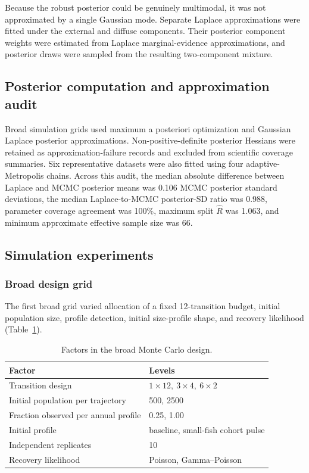 \documentclass[11pt]{article}
\begin{document}
Because the robust posterior could be genuinely multimodal, it was not
approximated by a single Gaussian mode. Separate Laplace approximations were
fitted under the external and diffuse components. Their posterior component
weights were estimated from Laplace marginal-evidence approximations, and
posterior draws were sampled from the resulting two-component mixture.

\subsection{Posterior computation and approximation audit}

Broad simulation grids used maximum a posteriori optimization and Gaussian
Laplace posterior approximations. Non-positive-definite posterior Hessians
were retained as approximation-failure records and excluded from scientific
coverage summaries. Six representative datasets were also fitted using four
adaptive-Metropolis chains. Across this audit, the median absolute difference
between Laplace and MCMC posterior means was 0.106 MCMC posterior standard
deviations, the median Laplace-to-MCMC posterior-SD ratio was 0.988, parameter
coverage agreement was 100\%, maximum split \(\widehat R\) was 1.063, and
minimum approximate effective sample size was 66.

\subsection{Simulation experiments}

\subsubsection{Broad design grid}

The first broad grid varied allocation of a fixed 12-transition budget,
initial population size, profile detection, initial size-profile shape, and
recovery likelihood (Table~\ref{tab:broad-grid}).

\begin{table}[H]
\centering
\caption{Factors in the broad Monte Carlo design.}
\label{tab:broad-grid}
\begin{tabular}{ll}
\toprule
Factor & Levels\\
\midrule
Transition design & \(1\times12,\ 3\times4,\ 6\times2\)\\
Initial population per trajectory & 500, 2500\\
Fraction observed per annual profile & 0.25, 1.00\\
Initial profile & baseline, small-fish cohort pulse\\
Independent replicates & 10\\
Recovery likelihood & Poisson, Gamma--Poisson\\
\bottomrule
\end{tabular}
\end{table}
\end{document}
